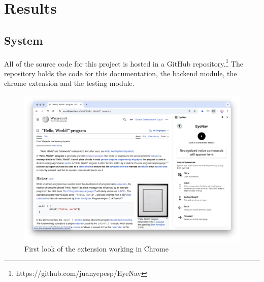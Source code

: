 \section{Results}

\subsection{System}

All of the source code for this project is hosted in a GitHub repository.\footnote{https://github.com/juanyepesp/EyeNav} The repository holds the code for this documentation, the backend module, the chrome extension and the testing module.

\begin{figure}[ht]
    \centering
    \includegraphics[width=1\textwidth]{images/screenshots/eyenav-1.png}
    \caption{First look of the extension working in Chrome}
    \label{fig:ss-1}
\end{figure}

